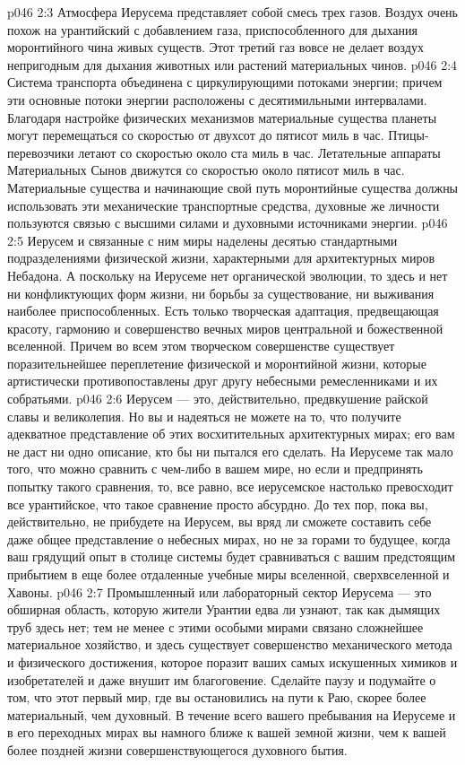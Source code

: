\vs p046 2:3 Атмосфера Иерусема представляет собой смесь трех газов. Воздух очень похож на урантийский с добавлением газа, приспособленного для дыхания моронтийного чина живых существ. Этот третий газ вовсе не делает воздух непригодным для дыхания животных или растений материальных чинов.
\vs p046 2:4 Система транспорта объединена с циркулирующими потоками энергии; причем эти основные потоки энергии расположены с десятимильными интервалами. Благодаря настройке физических механизмов материальные существа планеты могут перемещаться со скоростью от двухсот до пятисот миль в час. Птицы\hyp{}перевозчики летают со скоростью около ста миль в час. Летательные аппараты Материальных Сынов движутся со скоростью около пятисот миль в час. Материальные существа и начинающие свой путь моронтийные существа должны использовать эти механические транспортные средства, духовные же личности пользуются связью с высшими силами и духовными источниками энергии.
\vs p046 2:5 \pc Иерусем и связанные с ним миры наделены десятью стандартными подразделениями физической жизни, характерными для архитектурных миров Небадона. А поскольку на Иерусеме нет органической эволюции, то здесь и нет ни конфликтующих форм жизни, ни борьбы за существование, ни выживания наиболее приспособленных. Есть только творческая адаптация, предвещающая красоту, гармонию и совершенство вечных миров центральной и божественной вселенной. Причем во всем этом творческом совершенстве существует поразительнейшее переплетение физической и моронтийной жизни, которые артистически противопоставлены друг другу небесными ремесленниками и их собратьями.
\vs p046 2:6 Иерусем --- это, действительно, предвкушение райской славы и великолепия. Но вы и надеяться не можете на то, что получите адекватное представление об этих восхитительных архитектурных мирах; его вам не даст ни одно описание, кто бы ни пытался его сделать. На Иерусеме так мало того, что можно сравнить с чем\hyp{}либо в вашем мире, но если и предпринять попытку такого сравнения, то, все равно, все иерусемское настолько превосходит все урантийское, что такое сравнение просто абсурдно. До тех пор, пока вы, действительно, не прибудете на Иерусем, вы вряд ли сможете составить себе даже общее представление о небесных мирах, но не за горами то будущее, когда ваш грядущий опыт в столице системы будет сравниваться с вашим предстоящим прибытием в еще более отдаленные учебные миры вселенной, сверхвселенной и Хавоны.
\vs p046 2:7 \pc Промышленный или лабораторный сектор Иерусема --- это обширная область, которую жители Урантии едва ли узнают, так как дымящих труб здесь нет; тем не менее с этими особыми мирами связано сложнейшее материальное хозяйство, и здесь существует совершенство механического метода и физического достижения, которое поразит ваших самых искушенных химиков и изобретателей и даже внушит им благоговение. Сделайте паузу и подумайте о том, что этот первый мир, где вы остановились на пути к Раю, скорее более материальный, чем духовный. В течение всего вашего пребывания на Иерусеме и в его переходных мирах вы намного ближе к вашей земной жизни, чем к вашей более поздней жизни совершенствующегося духовного бытия.
